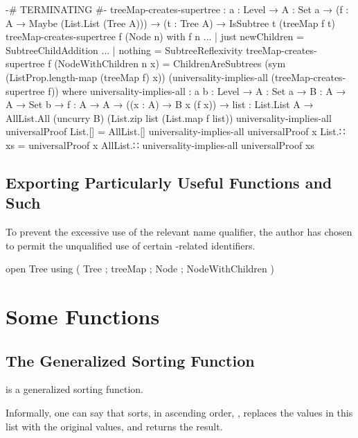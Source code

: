 \documentclass{report}
\begin{document}
\begin{code}
    {-# TERMINATING #-}
    treeMap-creates-supertree :
      {a : Level} →
      {A : Set a} →
      (f : A → Maybe (List.List (Tree A))) →
      (t : Tree A) →
      IsSubtree t (treeMap f t)
    treeMap-creates-supertree f (Node n) with f n
    ... | just newChildren = SubtreeChildAddition
    ... | nothing = SubtreeReflexivity
    treeMap-creates-supertree f (NodeWithChildren n x) =
      ChildrenAreSubtrees (sym (ListProp.length-map (treeMap f) x))
                          (universality-implies-all (treeMap-creates-supertree f))
      where
      universality-implies-all : {a b : Level} →
            {A : Set a} →
            {B : A → A → Set b} →
            {f : A → A} →
            ((x : A) → B x (f x)) →
            {list : List.List A} →
            AllList.All (uncurry B) (List.zip list (List.map f list))
      universality-implies-all universalProof {List.[]} = AllList.[]
      universality-implies-all universalProof {x List.∷ xs} =
        universalProof x AllList.∷ universality-implies-all universalProof {xs}
\end{code}

\section{Exporting Particularly Useful Functions and Such}
To prevent the excessive use of the relevant name qualifier, the author has chosen to permit the unqualified use of certain -related identifiers.

\begin{code}
open Tree
  using
    ( Tree
    ; treeMap
    ; Node
    ; NodeWithChildren
    )
\end{code}

\chapter{Some Functions}

\section{The Generalized Sorting Function}
 is a generalized sorting function.

Informally, one can say that     sorts, in ascending order,   , replaces the values in this  list with the original  values, and returns the result.
\end{document}
